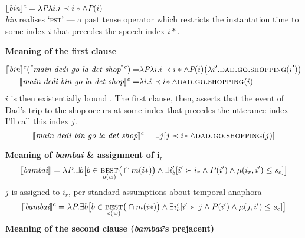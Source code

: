  $\denote[c]{\textit{bin}}= \lambda\textit{P}\lambda i.i\prec i*\wedge\textit{P}(i)$\\
 \textit{bin} realises `\textsc{pst}' --- a past tense operator which restricts the instantation time to some index $ i $ that precedes the speech index $ i* $.
 

\a \textbf{Meaning of the first clause}

\begin{align*}
\denote[c]{\textit{bin}}(\denote[c]{\textit{main dedi go la det shop}})=&\lambda\textit{P}\lambda i.i\prec i*\wedge\textit{P}(i)\big(\lambda i'.\textsc{dad.go.shopping}(i')\big)\\
\denote[c]{\textit{main dedi bin go la det shop}}=&\lambda i.i\prec i\!*\wedge \textsc{dad.go.shopping}(i)%
\end{align*}
$ i $ is then existentially bound \citep{Dowty1979,Stump1985,Ogihara1996}. The first clause, then, asserts that the event of Dad's trip to the shop occurs at some index that precedes the utterance index --- I'll call this index $ j $.
$$ \denote[c]{\textit{main dedi bin go la det shop}}=\exists j[j\prec i\!*\wedge \textsc{dad.go.shopping}(j)] $$




\a \textbf{Meaning of \textit{bambai} \& assignment of $ \boldsymbol{i_r} $}
$$	\denote{\textit{bambai}}=\lambda\textit{P}.\exists b
	\big[b\in\underset{o(w)}{\textsc{best}}\big(\cap m(i*)\big)\wedge \exists i'_b[i'\succ i_r\wedge P(i')\wedge\mu(i_r,i')\leq s_c]\big]$$
	$ j $ is assigned to $ i_r $, per standard assumptions about temporal anaphora \citetext{\textit{e.g.}, \citealt{Hinrihcs1986,Partee}, these insights have been implemented in DRT frameworks \S~\ref{bambai.subord}, see chapter 5 of \citealt{Kamp1993}.}
$$	\denote[c]{\textit{bambai}}=\lambda\textit{P}.\exists b
	\big[b\in\underset{o(w)}{\textsc{best}}\big(\cap m(i*)\big)\wedge \exists i'_b[i'\succ j\wedge P(i')\wedge\mu(j,i')\leq s_c]\big]$$
\a{} \textbf{Meaning of the second clause (\textit{bambai}'s prejacent)}

